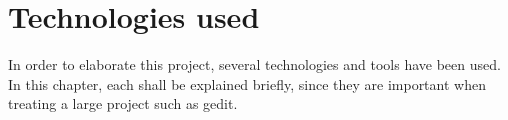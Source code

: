\chapter{Technologies used}\label{chap:Technologies}

In order to elaborate this project, several technologies and tools have been used. 
In this chapter, each shall be explained briefly, since they are important when treating a large project such as gedit.










